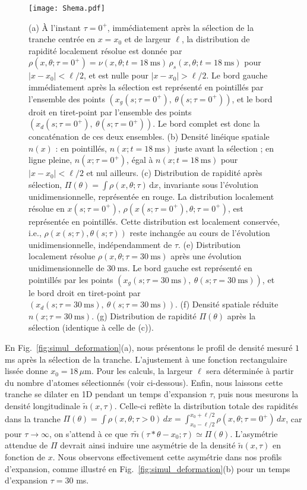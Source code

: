 \begin{figure}[!htb]
	\centering
	\texttt{[image: Shema.pdf]}
	\label{fig:BiPart.coupure2}
	\caption{
(a) À l'instant $\tau = 0^+$, immédiatement après la sélection de la tranche centrée en $x = x_0$ et de largeur $\ell$, la distribution de rapidité localement résolue est donnée par $\rho(x,\theta ; \tau = 0^+) = \nu(x, \theta ; t = 18~\mathrm{ms}) \, \rho_s(x,\theta ; t = 18~\mathrm{ms})$ pour $\vert x - x_0 \vert < \ell/2$, et est nulle pour $\vert x - x_0 \vert > \ell/2$. Le bord gauche immédiatement après la sélection est représenté en pointillés par l’ensemble des points $(x_g(s; \tau = 0^+),\ \theta(s; \tau = 0^+))$, et le bord droit en tiret-point par l’ensemble des points $(x_d(s; \tau = 0^+),\ \theta(s; \tau = 0^+))$. Le bord complet est donc la concaténation de ces deux ensembles. 
(b) Densité linéique spatiale $n(x)$ : en pointillés, $n(x; t = 18~\mathrm{ms})$ juste avant la sélection ; en ligne pleine, $n(x; \tau = 0^+)$, égal à $n(x; t = 18~\mathrm{ms})$ pour $\vert x - x_0 \vert < \ell/2$ et nul ailleurs. 
(c) Distribution de rapidité après sélection, $\Pi(\theta) = \int \rho(x,\theta ; \tau)\,\mathrm{d}x$, invariante sous l’évolution unidimensionnelle, représentée en rouge. La distribution localement résolue en $x(s; \tau = 0^+)$, $\rho(x(s; \tau = 0^+), \theta ; \tau = 0^+)$, est représentée en pointillés. Cette distribution est localement conservée, i.e., $\rho(x(s; \tau), \theta(s; \tau))$ reste inchangée au cours de l’évolution unidimensionnelle, indépendamment de $\tau$. 
(e) Distribution localement résolue $\rho(x, \theta ; \tau = 30~\mathrm{ms})$ après une évolution unidimensionnelle de $30~\mathrm{ms}$. Le bord gauche est représenté en pointillés par les points $(x_g(s; \tau = 30~\mathrm{ms}),\ \theta(s; \tau = 30~\mathrm{ms}))$, et le bord droit en tiret-point par $(x_d(s; \tau = 30~\mathrm{ms}),\ \theta(s; \tau = 30~\mathrm{ms}))$. 
(f) Densité spatiale réduite $n(x; \tau = 30~\mathrm{ms})$. 
(g) Distribution de rapidité $\Pi(\theta)$ après la sélection (identique à celle de (c)).
}
	
\end{figure}
 
En Fig.~\ref{fig:simul_deformation}(a), nous présentons le profil de densité mesuré $1$ ms après la sélection de la tranche.  
L’ajustement à une fonction rectangulaire lissée donne $x_0 = 18\,\mu$m.  
Pour les calculs, la largeur $\ell$ sera déterminée à partir du nombre d’atomes sélectionnés (voir ci-dessous).  
Enfin, nous laissons cette tranche se dilater en 1D pendant un temps d’expansion $\tau$, puis nous mesurons la densité longitudinale $\tilde{n}(x,\tau)$.  
Celle-ci reflète la distribution totale des rapidités dans la tranche $\Pi(\theta) = \int \rho(x, \theta ; \tau > 0)\, dx = \int_{x_0 - \ell/2}^{x_0 + \ell/2} \rho(x, \theta ; \tau = 0^+)\, dx$, car pour $\tau \rightarrow \infty$, on s’attend à ce que $\tau \tilde{n}( \tau * \theta - x_0  ;\tau) \simeq \Pi(\theta)$.  
L’asymétrie attendue de $\Pi$ devrait ainsi induire une asymétrie de la densité $\tilde{n}(x,\tau)$ en fonction de $x$.  
Nous observons effectivement cette asymétrie dans nos profils d’expansion, comme illustré en Fig.~\ref{fig:simul_deformation}(b) pour un temps d’expansion $\tau=30$ ms.

